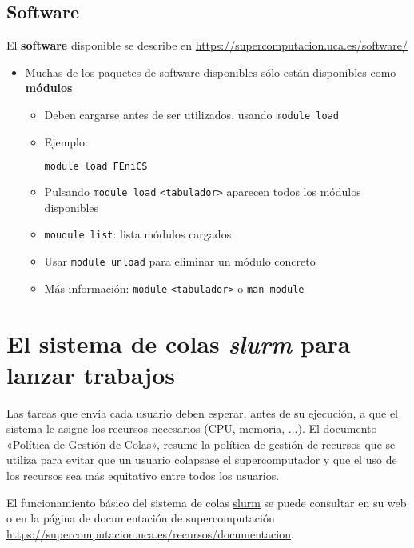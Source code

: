 \documentclass[11pt]{article}
\begin{document}
\subsection*{Software}
El \textbf{software} disponible se describe en \url{https://supercomputacion.uca.es/software/}
\begin{itemize}
\item Muchas de los paquetes de software disponibles sólo están
  disponibles como \textbf{módulos}
  \begin{itemize}
  \item Deben cargarse antes de ser utilizados, usando
    \texttt{module load}
  \item Ejemplo:
    \begin{lstlisting}[language=sh]
      module load FEniCS
    \end{lstlisting}
  \item Pulsando \texttt{module load} \texttt{<tabulador>} aparecen
    todos los módulos disponibles
  \item \texttt{moudule list}: lista módulos cargados
  \item Usar \texttt{module unload} para eliminar un módulo concreto

  \item Más información: \texttt{module} \texttt{<tabulador>} o \texttt{man module}
  \end{itemize}
\end{itemize}

\section{El sistema de colas \textit{slurm} para lanzar trabajos}
\label{sec:supercomputador-UCA}
Las tareas que envía cada usuario deben esperar, antes de su
ejecución, a que el sistema le asigne los recursos necesarios (CPU,
memoria, ...). El documento
«\href{http://supercomputacion.uca.es/recursos/documentacion/politicas-de-gestion-de-colas}{Política
  de Gestión de Colas}», resume la política de gestión de recursos que
se utiliza para evitar que un usuario colapsase el supercomputador y
que el uso de los recursos sea más equitativo entre todos los
usuarios.

El funcionamiento básico del sistema de colas
\href{https://slurm.schedmd.com/quickstart.html}{slurm} se puede consultar en su
web o en la página de documentación de supercomputación
\url{https://supercomputacion.uca.es/recursos/documentacion}.
\end{document}
